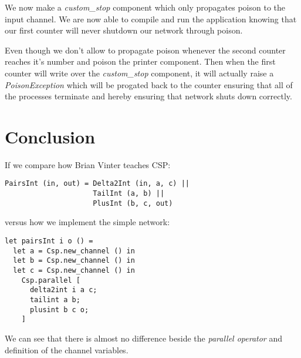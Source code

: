 \documentclass[a4paper,12pt]{article}
\begin{document}
We now make a {\it custom\_stop} component which only propagates poison to
the input channel. We are now able to compile and run the application knowing
that our first counter will never shutdown our network through poison.

Even though we don't allow to propagate poison whenever the second counter
reaches it's number and poison the printer component. Then when the first
counter will write over the {\it custom\_stop} component, it will actually
raise a {\it PoisonException} which will be progated back to the counter
ensuring that all of the processes terminate and hereby ensuring that network
shuts down correctly.



\section{Conclusion}
\label{conclusion}

If we compare how Brian Vinter teaches CSP\cite{vintercsp}:
\begin{center}
\begin{verbatim}
PairsInt (in, out) = Delta2Int (in, a, c) || 
                     TailInt (a, b) || 
                     PlusInt (b, c, out) 
\end{verbatim}
\end{center}

versus how we implement the simple network:

\begin{verbatim}
let pairsInt i o () =
  let a = Csp.new_channel () in
  let b = Csp.new_channel () in
  let c = Csp.new_channel () in
    Csp.parallel [
      delta2int i a c;
      tailint a b;
      plusint b c o;
    ]
\end{verbatim}

We can see that there is almost no difference beside the {\it parallel operator}
and definition of the channel variables.
\end{document}
